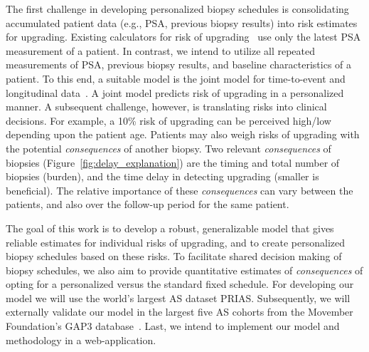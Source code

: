 The first challenge in developing personalized biopsy schedules is consolidating accumulated patient data (e.g., PSA, previous biopsy results) into risk estimates for upgrading. Existing calculators for risk of upgrading~\citep{partin1993use,makarov2007updated} use only the latest PSA measurement of a patient. In contrast, we intend to utilize all repeated measurements of PSA, previous biopsy results, and baseline characteristics of a patient. To this end, a suitable model is the joint model for time-to-event and longitudinal data~\citep{tomer2019, coley2017prediction,rizopoulos2012joint}. A joint model predicts risk of upgrading in a personalized manner. A subsequent challenge, however, is translating risks into clinical decisions. For example, a 10\% risk of upgrading can be perceived high/low depending upon the patient age. Patients may also weigh risks of upgrading with the potential \textit{consequences} of another biopsy. Two relevant \textit{consequences} of biopsies (Figure~\ref{fig:delay_explanation}) are the timing and total number of biopsies (burden), and the time delay in detecting upgrading (smaller is beneficial). The relative importance of these \textit{consequences} can vary between the patients, and also over the follow-up period for the same patient.

The goal of this work is to develop a robust, generalizable model that gives reliable estimates for individual risks of upgrading, and to create personalized biopsy schedules based on these risks. To facilitate shared decision making of biopsy schedules, we also aim to provide quantitative estimates of \textit{consequences} of opting for a personalized versus the standard fixed schedule. For developing our model we will use the world’s largest AS dataset PRIAS. Subsequently, we will externally validate our model in the largest five AS cohorts from the Movember Foundation's GAP3 database~\citep{gap3_2018}. Last, we intend to implement our model and methodology in a web-application.